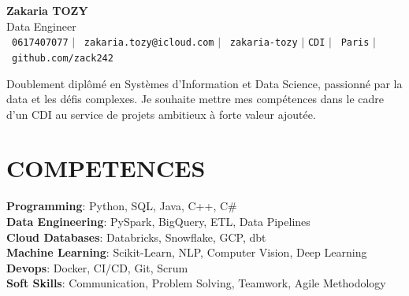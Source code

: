 \documentclass[letterpaper,11pt]{article}
\begin{document}
\begin{center}
    \textbf{\Huge Zakaria TOZY} \\ \vspace{3pt}
    \Large Data Engineer \\ \vspace{5pt}
    \small \faPhone\ \texttt{0617407077} \hspace{1pt} $|$
    \hspace{1pt} \faEnvelope\ \texttt{zakaria.tozy@icloud.com} \hspace{1pt} $|$
    \hspace{1pt} \faLinkedin\ \texttt{zakaria-tozy} \hspace{1pt} $|$
    \hspace{1pt} \texttt{CDI} \hspace{1pt} $|$
    \hspace{1pt} \faMapMarker\ \texttt{Paris} \hspace{1pt} $|$
    \hspace{1pt} \faGithub\ \texttt{github.com/zack242} \\ \vspace{10pt}
\end{center}

\begin{itemize}[leftmargin=0in, label={}]
\small{\item{
Doublement diplômé en Systèmes d'Information et Data Science, passionné par la data et les défis complexes. Je souhaite mettre mes compétences dans le cadre d'un CDI au service de projets ambitieux à forte valeur ajoutée.
}}
\end{itemize}

\section{COMPETENCES}
\begin{itemize}[leftmargin=0in, label={}]
\small{\item{
\textbf{Programming}: Python, SQL, Java, C++, C{\#} \\
\vspace{1pt}
\textbf{Data Engineering}: PySpark, BigQuery, ETL, Data Pipelines \\
\vspace{1pt}
\textbf{Cloud Databases}: Databricks, Snowflake, GCP, dbt \\
\vspace{1pt}
\textbf{Machine Learning}: Scikit-Learn, NLP, Computer Vision, Deep Learning \\
\vspace{1pt}
\textbf{Devops}: Docker, CI/CD, Git, Scrum \\
\vspace{1pt}
\textbf{Soft Skills}: Communication, Problem Solving, Teamwork, Agile Methodology
}
}
\end{itemize}
\end{document}
